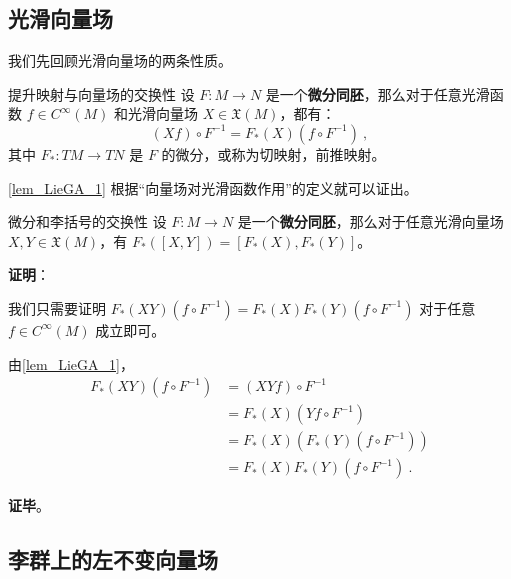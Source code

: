 

\subsection{光滑向量场}


我们先回顾光滑向量场的两条性质。

\begin{lemma}{提升映射与向量场的交换性}\label{lem_LieGA_1}
设 $F:M\to N$ 是一个\textbf{微分同胚}，那么对于任意光滑函数 $f\in C^{\infty}(M)$ 和光滑向量场 $X\in\mathfrak{X}(M)$，都有：
\begin{equation}\label{eq_LieGA_1}
(Xf)\circ F^{-1}=F_*(X)(f\circ F^{-1})~,
\end{equation}
其中 $F_*:TM\to TN$ 是 $F$ 的微分，或称为切映射，前推映射。
\end{lemma}

\autoref{lem_LieGA_1} 根据“向量场对光滑函数作用”的定义就可以证出。


\begin{lemma}{微分和李括号的交换性}\label{lem_LieGA_2}
设 $F:M\to N$ 是一个\textbf{微分同胚}，那么对于任意光滑向量场 $X, Y\in\mathfrak{X}(M)$，有 $F_*([X, Y])=[F_*(X), F_*(Y)]$。
\end{lemma}

\textbf{证明}：

我们只需要证明 $F_*(XY)(f\circ F^{-1})=F_*(X)F_*(Y)(f\circ F^{-1})$ 对于任意 $f\in C^{\infty}(M)$ 成立即可。

由\autoref{lem_LieGA_1}，
\begin{equation}
\begin{aligned}
F_*(XY)(f\circ F^{-1})&=(XYf)\circ F^{-1}\\
&=F_*(X)(Yf\circ F^{-1})\\
&=F_*(X)(F_*(Y)(f\circ F^{-1}))\\
&=F_*(X)F_*(Y)(f\circ F^{-1})~.
\end{aligned}
\end{equation}

\textbf{证毕}。

\subsection{李群上的左不变向量场}

